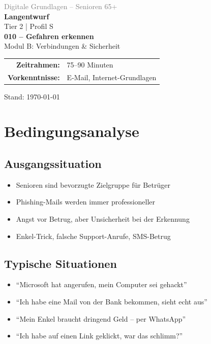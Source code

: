 \documentclass[11pt,a4paper]{article}
\begin{document}
\begin{titlepage}
    \centering
    \vspace*{2cm}
    {\Large\textcolor{gray}{Digitale Grundlagen -- Senioren 65+}}\\[2cm]
    {\Huge\textcolor{fach}{\textbf{Langentwurf}}}\\[0.5cm]
    {\large Tier 2 | Profil S}\\[2cm]
    {\LARGE\textbf{010 -- Gefahren erkennen}}\\[0.5cm]
    {\large Modul B: Verbindungen \& Sicherheit}\\[2cm]
    \begin{tabular}{rl}
        \textbf{Zeitrahmen:} & 75--90 Minuten \\
        \textbf{Vorkenntnisse:} & E-Mail, Internet-Grundlagen \\
    \end{tabular}
    \vfill
    {\normalsize Stand: \today}
\end{titlepage}

\tableofcontents
\newpage

\section{Bedingungsanalyse}

\subsection{Ausgangssituation}
\begin{itemize}
    \item Senioren sind bevorzugte Zielgruppe für Betrüger
    \item Phishing-Mails werden immer professioneller
    \item Angst vor Betrug, aber Unsicherheit bei der Erkennung
    \item Enkel-Trick, falsche Support-Anrufe, SMS-Betrug
\end{itemize}

\subsection{Typische Situationen}
\begin{itemize}
    \item ``Microsoft hat angerufen, mein Computer sei gehackt''
    \item ``Ich habe eine Mail von der Bank bekommen, sieht echt aus''
    \item ``Mein Enkel braucht dringend Geld -- per WhatsApp''
    \item ``Ich habe auf einen Link geklickt, war das schlimm?''
\end{itemize}
\end{document}
